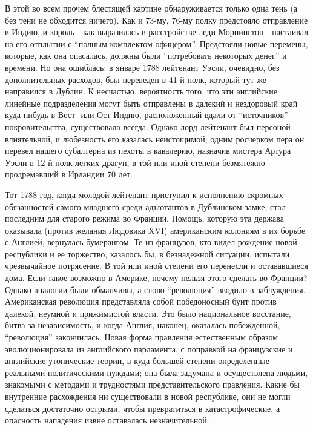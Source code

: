 \documentclass[
  oneside,
  12pt,
  titlepage]{book}
\begin{document}
В этой во всем прочем блестящей картине обнаруживается только одна тень (а без тени не обходится ничего). Как и 73-му, 76-му полку предстояло отправление в Индию, и король - как выразилась в расстройстве леди Морнингтон - настаивал на его отплытии с ``полным комплектом офицером''. Предстояли новые перемены, которые, как она опасалась, должны были ``потребовать некоторых денег'' и времени. Но она ошиблась: в январе 1788 лейтенант Уэсли, очевидно, без дополнительных расходов, был переведен в 41-й полк, который тут же направился в Дублин. К несчастью, вероятность того, что эти английские линейные подразделения могут быть отправлены в далекий и нездоровый край куда-нибудь в Вест- или Ост-Индию, расположенный вдали от ``источников'' покровительства, существовала всегда. Однако лорд-лейтенант был персоной влиятельной, и любезность его казалась неистощимой; одним росчерком пера он перевел нашего субалтерна из пехоты в кавалерию, назначив мистера Артура Уэсли в 12-й полк легких драгун, в той или иной степени безмятежно продремавший в Ирландии 70 лет.

Тот 1788 год, когда молодой лейтенант приступил к исполнению скромных обязанностей самого младшего среди адъютантов в Дублинском замке, стал последним для старого режима во Франции. Помощь, которую эта держава оказывала (против желания Людовика XVI) американским колониям в их борьбе с Англией, вернулась бумерангом. Те из французов, кто видел рождение новой республики и ее торжество, казалось бы, в безнадежной ситуации, испытали чрезвычайное потрясение. В той или иной степени его перенесли и остававшиеся дома. Если такое возможно в Америке, почему нельзя этого сделать во Франции? Однако аналогии были обманчивы, а слово ``революция'' вводило в заблуждения. Американская революция представляла собой победоносный бунт против далекой, неумной и прижимистой власти. Это было национальное восстание, битва за независимость, и когда Англия, наконец, оказалась побежденной, ``революция'' закончилась. Новая форма правления естественным образом эволюционировала из английского парламента, с поправкой на французские и английские утопические теории, в куда большей степени определенные реальными политическими нуждами; она была задумана и осуществлена людьми, знакомыми с методами и трудностями представительского правления. Какие бы внутренние расхождения ни существовали в новой республике, они не могли сделаться достаточно острыми, чтобы превратиться в катастрофические, а опасность нападения извне оставалась незначительной.
\end{document}
